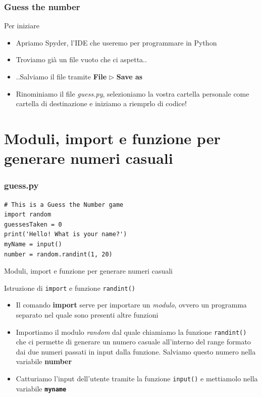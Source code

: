 \documentclass{beamer}
\begin{document}
\begin{frame}[fragile]
\frametitle{Guess the number}
\begin{block}{Per iniziare}
	\begin{itemize}
		\item Apriamo Spyder, l'IDE che useremo per programmare in Python
		\item Troviamo già un file vuoto che ci aspetta..
		\item ..Salviamo il file  tramite \textbf{File} $\rhd$ \textbf{Save as}
		\item Rinominiamo il file \textit{guess.py}, selezioniamo la vostra cartella personale come cartella di destinazione e iniziamo a riemprlo di codice!
	\end{itemize}
\end{block}
    
\end{frame}

\section{Moduli, import e funzione per generare numeri casuali}

\begin{frame}[fragile]
\frametitle{guess.py}
    \begin{lstlisting}
# This is a Guess the Number game
import random
guessesTaken = 0
print('Hello! What is your name?')
myName = input()
number = random.randint(1, 20)
    \end{lstlisting}
\end{frame}

\begin{frame}{Moduli, import e funzione per generare numeri casuali}
    \begin{block}{Istruzione di \texttt{import} e funzione \texttt{randint()}}
        \begin{itemize}
            \item Il comando \textbf{import} serve per importare un \textit{modulo}, ovvero un programma separato nel quale sono presenti altre funzioni
            \item Importiamo il modulo \textit{random} dal quale chiamiamo la funzione \texttt{randint()} che ci permette di generare un numero casuale all'interno del range formato dai due numeri passati in input dalla funzione. Salviamo questo numero nella variabile \textbf{\textrm{number}}
            \item Catturiamo l'input dell'utente tramite la funzione \texttt{input()} e mettiamolo nella variabile \textbf{\texttt{myname}}
        \end{itemize}
        
    \end{block}
\end{frame}
\end{document}
